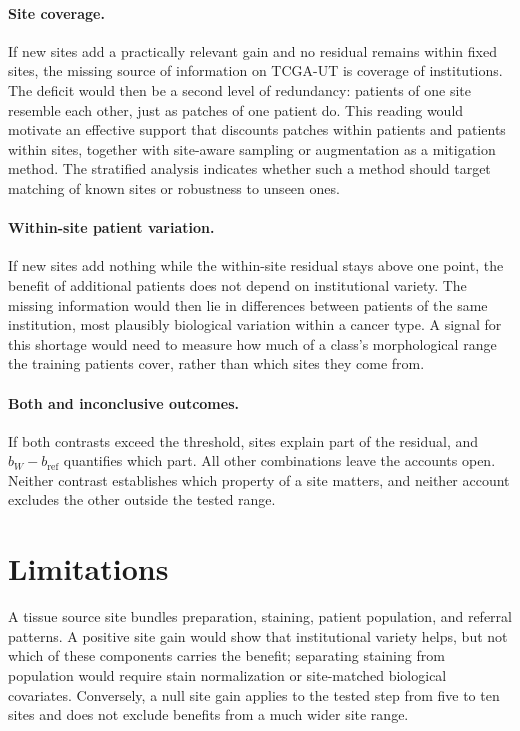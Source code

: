 \documentclass[11pt]{article}
\begin{document}
\paragraph{Site coverage.}
If new sites add a practically relevant gain and no residual remains within fixed sites, the missing source of information on TCGA-UT is coverage of institutions. The deficit would then be a second level of redundancy: patients of one site resemble each other, just as patches of one patient do. This reading would motivate an effective support that discounts patches within patients and patients within sites, together with site-aware sampling or augmentation as a mitigation method. The stratified analysis indicates whether such a method should target matching of known sites or robustness to unseen ones.

\paragraph{Within-site patient variation.}
If new sites add nothing while the within-site residual stays above one point, the benefit of additional patients does not depend on institutional variety. The missing information would then lie in differences between patients of the same institution, most plausibly biological variation within a cancer type. A signal for this shortage would need to measure how much of a class's morphological range the training patients cover, rather than which sites they come from.

\paragraph{Both and inconclusive outcomes.}
If both contrasts exceed the threshold, sites explain part of the residual, and $b_W-b_{\mathrm{ref}}$ quantifies which part. All other combinations leave the accounts open. Neither contrast establishes which property of a site matters, and neither account excludes the other outside the tested range.

\section{Limitations}
\label{sec:limitations}
A tissue source site bundles preparation, staining, patient population, and referral patterns. A positive site gain would show that institutional variety helps, but not which of these components carries the benefit; separating staining from population would require stain normalization or site-matched biological covariates. Conversely, a null site gain applies to the tested step from five to ten sites and does not exclude benefits from a much wider site range.
\end{document}
